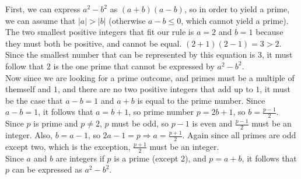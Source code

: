 \documentclass[10pt]{article}
\begin{document}
First, we can express $a^2 - b^2$ as $(a + b)(a - b)$, so in order to yield a prime, we can assume that $|a| > |b|$ (otherwise $a - b \leq 0$, which cannot yield
a prime). \\

The two smallest positive integers that fit our rule is $a = 2$ and $b = 1$ because they must both be positive, and cannot be equal.  $(2 + 1)(2 - 1) = 3 > 2$.  
Since the smallest number that can be represented by this equation is $3$, it must follow that $2$ is the one prime that cannot be expressed by $a^2 - b^2$. \\

Now since we are looking for a prime outcome, and primes must be a multiple of themself and $1$, and there are no two positive integers that 
add up to $1$, it must be the case that $a - b = 1$ and $a + b$ is equal to the prime number.  Since $a - b = 1$, it follows that $a = b + 1$, so prime number 
$p = 2b + 1$, so $b = \frac{p-1}{2}$. \\

Since $p$ is prime and $p \not= 2$, $p$ must be odd, so $p - 1$ is even and $\frac{p-1}{2}$ must be an integer.  Also, $b = a - 1$, so $2a - 1 = p \Rightarrow
a = \frac{p + 1}{2}$.  Again since all primes are odd except two, which is the exception, $\frac{p+1}{2}$ must be an integer. \\

Since $a$ and $b$ are integers if $p$ is a prime (except 2), and $p = a + b$, it follows that $p$ can be expressed as $a^2 - b^2$.
\end{document}

